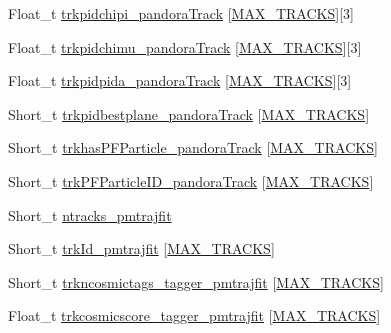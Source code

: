 \begin{DoxyCompactItemize}
Float\-\_\-t \hyperlink{classanatree_ac6e609689ab0d14cc79c56d8a8e439dd}{trkpidchipi\-\_\-pandora\-Track} \mbox{[}\hyperlink{anatree__core__v09410002__orig_8h_a327fd4e796e4a0d78947524c96e4362e}{M\-A\-X\-\_\-\-T\-R\-A\-C\-K\-S}\mbox{]}\mbox{[}3\mbox{]}
\item 
Float\-\_\-t \hyperlink{classanatree_a9d167b902c1054222e86725b09ec5829}{trkpidchimu\-\_\-pandora\-Track} \mbox{[}\hyperlink{anatree__core__v09410002__orig_8h_a327fd4e796e4a0d78947524c96e4362e}{M\-A\-X\-\_\-\-T\-R\-A\-C\-K\-S}\mbox{]}\mbox{[}3\mbox{]}
\item 
Float\-\_\-t \hyperlink{classanatree_ac41f2bcea1bd90c759c8b1442bd08b00}{trkpidpida\-\_\-pandora\-Track} \mbox{[}\hyperlink{anatree__core__v09410002__orig_8h_a327fd4e796e4a0d78947524c96e4362e}{M\-A\-X\-\_\-\-T\-R\-A\-C\-K\-S}\mbox{]}\mbox{[}3\mbox{]}
\item 
Short\-\_\-t \hyperlink{classanatree_ae128446738d35991ed6e5769c7237527}{trkpidbestplane\-\_\-pandora\-Track} \mbox{[}\hyperlink{anatree__core__v09410002__orig_8h_a327fd4e796e4a0d78947524c96e4362e}{M\-A\-X\-\_\-\-T\-R\-A\-C\-K\-S}\mbox{]}
\item 
Short\-\_\-t \hyperlink{classanatree_a3d73017e5943a039c29b4af9bc7e7a3d}{trkhas\-P\-F\-Particle\-\_\-pandora\-Track} \mbox{[}\hyperlink{anatree__core__v09410002__orig_8h_a327fd4e796e4a0d78947524c96e4362e}{M\-A\-X\-\_\-\-T\-R\-A\-C\-K\-S}\mbox{]}
\item 
Short\-\_\-t \hyperlink{classanatree_a3edd8410cece1ec89caa7c2800a746f3}{trk\-P\-F\-Particle\-I\-D\-\_\-pandora\-Track} \mbox{[}\hyperlink{anatree__core__v09410002__orig_8h_a327fd4e796e4a0d78947524c96e4362e}{M\-A\-X\-\_\-\-T\-R\-A\-C\-K\-S}\mbox{]}
\item 
Short\-\_\-t \hyperlink{classanatree_a599451e03494f8dd8e157c5d78ddd6e2}{ntracks\-\_\-pmtrajfit}
\item 
Short\-\_\-t \hyperlink{classanatree_a458e0b93db2bd382d4d6ee451fd332e8}{trk\-Id\-\_\-pmtrajfit} \mbox{[}\hyperlink{anatree__core__v09410002__orig_8h_a327fd4e796e4a0d78947524c96e4362e}{M\-A\-X\-\_\-\-T\-R\-A\-C\-K\-S}\mbox{]}
\item 
Short\-\_\-t \hyperlink{classanatree_a0b0cb717611cbc15d4f5758e3949d410}{trkncosmictags\-\_\-tagger\-\_\-pmtrajfit} \mbox{[}\hyperlink{anatree__core__v09410002__orig_8h_a327fd4e796e4a0d78947524c96e4362e}{M\-A\-X\-\_\-\-T\-R\-A\-C\-K\-S}\mbox{]}
\item 
Float\-\_\-t \hyperlink{classanatree_a63d3c200d7638641c0a242f46a910dd0}{trkcosmicscore\-\_\-tagger\-\_\-pmtrajfit} \mbox{[}\hyperlink{anatree__core__v09410002__orig_8h_a327fd4e796e4a0d78947524c96e4362e}{M\-A\-X\-\_\-\-T\-R\-A\-C\-K\-S}\mbox{]}

\end{DoxyCompactItemize}

